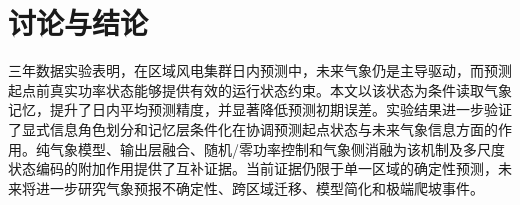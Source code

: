 \section{讨论与结论}

三年数据实验表明，在区域风电集群日内预测中，未来气象仍是主导驱动，而预测起点前真实功率状态能够提供有效的运行状态约束。本文以该状态为条件读取气象记忆，提升了日内平均预测精度，并显著降低预测初期误差。实验结果进一步验证了显式信息角色划分和记忆层条件化在协调预测起点状态与未来气象信息方面的作用。纯气象模型、输出层融合、随机/零功率控制和气象侧消融为该机制及多尺度状态编码的附加作用提供了互补证据。当前证据仍限于单一区域的确定性预测，未来将进一步研究气象预报不确定性、跨区域迁移、模型简化和极端爬坡事件。
